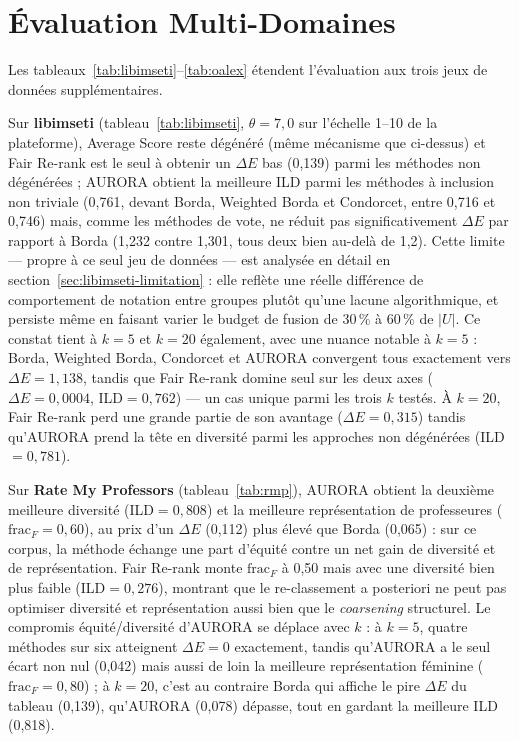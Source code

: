 \documentclass[12pt]{report}
\begin{document}
\section{Évaluation Multi-Domaines}

Les tableaux~\ref{tab:libimseti}--\ref{tab:oalex} étendent l'évaluation
aux trois jeux de données supplémentaires.

Sur \textbf{libimseti} (tableau~\ref{tab:libimseti}, $\theta=7{,}0$ sur
l'échelle 1--10 de la plateforme), Average Score reste dégénéré (même
mécanisme que ci-dessus) et Fair Re-rank est le seul à obtenir un
$\Delta E$ bas (0,139) parmi les méthodes non dégénérées ; AURORA obtient
la meilleure ILD parmi les méthodes à inclusion non triviale (0,761,
devant Borda, Weighted Borda et Condorcet, entre 0,716 et 0,746) mais,
comme les méthodes de vote, ne réduit pas significativement $\Delta E$
par rapport à Borda (1,232 contre 1,301, tous deux bien au-delà de 1,2).
Cette limite --- propre à ce seul jeu de
données --- est analysée en détail en
section~\ref{sec:libimseti-limitation} : elle reflète une réelle
différence de comportement de notation entre groupes plutôt qu'une
lacune algorithmique, et persiste même en faisant varier le budget de
fusion de 30\,\% à 60\,\% de $|U|$. Ce constat tient à $k=5$ et
$k=20$ également, avec une nuance notable à $k=5$ : Borda, Weighted
Borda, Condorcet et AURORA convergent tous exactement vers
$\Delta E = 1{,}138$, tandis que Fair Re-rank domine seul sur les deux
axes ($\Delta E = 0{,}0004$, ILD$=0{,}762$) --- un cas unique parmi les
trois $k$ testés. À $k=20$, Fair Re-rank perd une grande partie de son
avantage ($\Delta E = 0{,}315$) tandis qu'AURORA prend la tête en
diversité parmi les approches non dégénérées (ILD$=0{,}781$).

Sur \textbf{Rate My Professors} (tableau~\ref{tab:rmp}), AURORA obtient
la deuxième meilleure diversité (ILD$=0{,}808$) et la meilleure
représentation de professeures ($\mathrm{frac}_F=0{,}60$), au prix d'un
$\Delta E$ (0,112) plus élevé que Borda (0,065) : sur ce corpus, la
méthode échange une part d'équité contre un net gain de diversité et de
représentation. Fair Re-rank monte $\mathrm{frac}_F$ à 0,50 mais avec une
diversité bien plus faible (ILD$=0{,}276$), montrant que le re-classement
a posteriori ne peut pas optimiser diversité et représentation aussi
bien que le \emph{coarsening} structurel. Le compromis équité/diversité
d'AURORA se déplace avec $k$ : à $k=5$, quatre méthodes sur six
atteignent $\Delta E = 0$ exactement, tandis qu'AURORA a le seul écart
non nul (0,042) mais aussi de loin la meilleure représentation
féminine ($\mathrm{frac}_F=0{,}80$) ; à $k=20$, c'est au contraire Borda
qui affiche le pire $\Delta E$ du tableau (0,139), qu'AURORA (0,078)
dépasse, tout en gardant la meilleure ILD (0,818).
\end{document}
